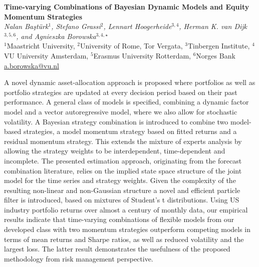\documentclass[12pt]{article}
\newcommand{\postertitle}[1]{{\Large\bf #1}\\[12pt]}
\newcommand{\authors}[1]{\emph{#1}\\}
\newcommand{\affiliations}[1]{{#1}\\}
\newcommand{\contacts}[1]{{#1}}
\begin{document}
\begin{center}
\vspace*{0.5cm}
%
\postertitle{Time-varying Combinations of Bayesian Dynamic Models and Equity Momentum Strategies}
%
\authors{Nalan Ba\c{s}t\"{u}rk$^{1}$, Stefano Grassi$^{2}$, Lennart Hoogerheide$^{3,4}$, Herman K. van Dijk$^{3,5,6}$, and Agnieszka Borowska$^{3,4,\star}$} %
% 
\affiliations{$^{1}$Maastricht University, $^{2}$University of Rome, Tor Vergata, $^{3}$Tinbergen Institute, $^{4}$VU University Amsterdam, $^{5}$Erasmus University Rotterdam, $^{6}$Norges Bank}

\contacts{\url{a.borowska@vu.nl}} %
%
\vspace*{0.3cm}
\end{center}

A novel dynamic asset-allocation approach is proposed where portfolios as well as portfolio strategies are updated at every decision period based on their past performance. A general class of models is specified, combining a dynamic factor model and a vector autoregressive model, where we also allow for stochastic volatility. A Bayesian strategy combination is introduced to combine two model-based strategies, a model momentum strategy based on fitted returns and a residual momentum strategy. This extends the mixture of experts analysis by allowing the strategy weights to be interdependent, time-dependent and incomplete. The presented estimation approach, originating from the forecast combination literature, relies on the implied state space structure of the joint model for the time series and strategy weights. Given the complexity of the resulting non-linear and non-Gaussian structure a novel and efficient particle filter is introduced, based on mixtures of Student's t distributions. Using US industry portfolio returns over almost a century of monthly data, our empirical results indicate that time-varying combinations of flexible models from our developed class with two momentum strategies outperform competing models in terms of mean returns and Sharpe ratios, as well as reduced volatility and the largest loss. The latter result demonstrates the usefulness of the proposed methodology from risk management perspective.
\end{document}
